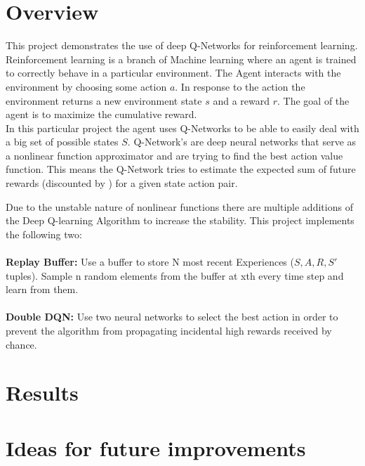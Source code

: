 \documentclass[12pt,a4paper]{article}
\begin{document}
    \section{Overview}\label{sec:overview}
    This project demonstrates the use of deep Q-Networks for reinforcement learning.
    Reinforcement learning is a branch of Machine learning where an agent is trained to correctly behave in
    a particular environment.
    The Agent interacts with the environment by choosing some action $a$.
    In response to the action the environment returns a new environment state $s$ and a reward $r$.
    The goal of the agent is to maximize the cumulative reward.
    \\
    In this particular project the agent uses Q-Networks to be able to easily deal with a big set of possible states $S$.
    Q-Network's are deep neural networks that serve as a nonlinear function approximator and are trying to find the best action value function.
    This means the Q-Network tries to estimate the expected sum of future rewards (discounted by \gamma) for a given state action pair.


    Due to the unstable nature of nonlinear functions there are multiple additions of the Deep Q-learning Algorithm to increase the stability.
    This project implements the following two:
    \\\\
    \textbf{Replay Buffer:}
    Use a buffer to store N most recent Experiences ($S, A, R, S'$ tuples).
    Sample n random elements from the buffer at xth every time step and learn from them.
    \\\\
    \textbf{Double DQN:}
    Use two neural networks to select the best action in order to prevent the algorithm from propagating incidental high rewards received by chance.


    \section{Results}\label{sec:results}


    \section{Ideas for future improvements}\label{sec:ideas}
\end{document}
